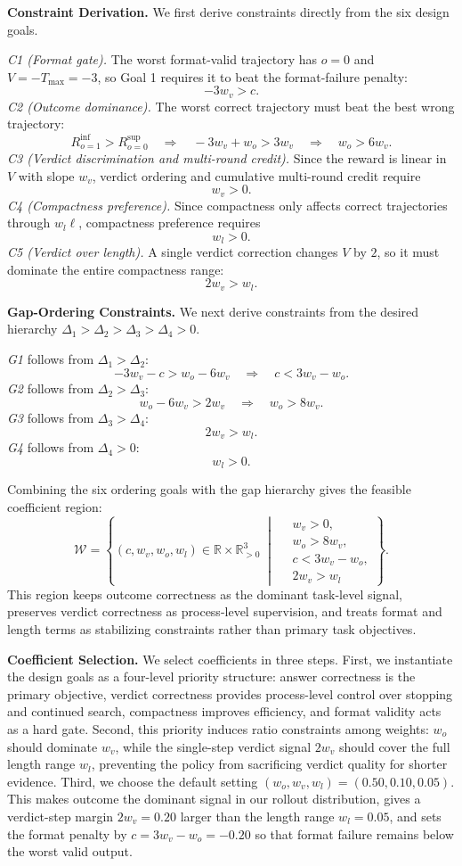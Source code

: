 \noindent\textbf{Constraint Derivation.}
We first derive constraints directly from the six design goals.

\noindent\emph{C1
(Format gate).} The worst format-valid trajectory has $o=0$ and
$V=-T_{\max}=-3$, so Goal 1 requires it to beat the format-failure penalty:
\[
-3w_v>c.
\]
\emph{C2 (Outcome dominance).} The worst correct trajectory must beat the
best wrong trajectory:
\[
R^{\inf}_{o=1}>R^{\sup}_{o=0}
\quad\Longrightarrow\quad
-3w_v+w_o>3w_v
\quad\Longrightarrow\quad
w_o>6w_v.
\]
\emph{C3 (Verdict discrimination and multi-round credit).} Since the reward
is linear in $V$ with slope $w_v$, verdict ordering and cumulative multi-round
credit require
\[
w_v>0.
\]
\emph{C4 (Compactness preference).} Since compactness only affects correct
trajectories through $w_l\ell$, compactness preference requires
\[
w_l>0.
\]
\emph{C5 (Verdict over length).} A single verdict correction changes
$V$ by $2$, so it must dominate the entire compactness range:
\[
2w_v>w_l.
\]

\noindent\textbf{Gap-Ordering Constraints.}
We next derive constraints from the desired hierarchy
$\Delta_1>\Delta_2>\Delta_3>\Delta_4>0$.

\noindent\emph{G1} follows from
$\Delta_1>\Delta_2$:
\[
-3w_v-c>w_o-6w_v
\quad\Longrightarrow\quad
c<3w_v-w_o.
\]
\emph{G2} follows from $\Delta_2>\Delta_3$:
\[
w_o-6w_v>2w_v
\quad\Longrightarrow\quad
w_o>8w_v.
\]
\emph{G3} follows from $\Delta_3>\Delta_4$:
\[
2w_v>w_l.
\]
\emph{G4} follows from $\Delta_4>0$:
\[
w_l>0.
\]

Combining the six ordering goals with the gap hierarchy gives the feasible
coefficient region:
\[
\mathcal{W}=
\left\{(c,w_v,w_o,w_l)\in\mathbb{R}\times\mathbb{R}_{>0}^{3}\;\middle|\;
\begin{aligned}
&w_v>0,\\
&w_o>8w_v,\\
&c<3w_v-w_o,\\
&2w_v>w_l
\end{aligned}
\right\}.
\]
This region keeps outcome correctness as the dominant task-level signal,
preserves verdict correctness as process-level supervision, and treats format
and length terms as stabilizing constraints rather than primary task objectives.

\noindent\textbf{Coefficient Selection.}
We select coefficients in three steps. First, we instantiate the design goals
as a four-level priority structure: answer correctness is the primary objective,
verdict correctness provides process-level control over stopping and continued
search, compactness improves efficiency, and format validity acts as a hard
gate. Second, this priority induces ratio constraints among weights: $w_o$
should dominate $w_v$, while the single-step verdict signal $2w_v$ should cover
the full length range $w_l$, preventing the policy from sacrificing verdict
quality for shorter evidence. Third, we choose the default setting
$(w_o,w_v,w_l)=(0.50,0.10,0.05)$. This makes outcome the dominant signal in our
rollout distribution, gives a verdict-step margin $2w_v=0.20$ larger than the
length range $w_l=0.05$, and sets the format penalty by
$c=3w_v-w_o=-0.20$ so that format failure remains below the worst valid output.


